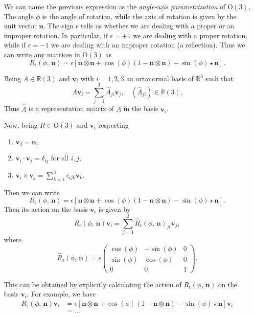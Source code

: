 We can name the previous expression as the \textit{angle-axis parametrization} of \(\mathrm{O}(3)\). The angle \(\phi\) is the angle of rotation, while the axis of rotation is given by the unit vector \(\mathbf{n}\). The sign \(\epsilon\) tells us whether we are dealing with a proper or an improper rotation. In particular, if \(\epsilon = +1\) we are dealing with a proper rotation, while if \(\epsilon = -1\) we are dealing with an improper rotation (a reflection). Thus we can write any matrices in \(\mathrm{O}(3)\) as
\[
    R_{\epsilon}(\phi,\,\mathbf{n}) = \epsilon \left[ \mathbf{n} \otimes \mathbf{n} + \cos(\phi) (1 - \mathbf{n} \otimes \mathbf{n}) - \sin(\phi) \star \mathbf{n} \right].
\]

\begin{example}[Exercise]
    Being \(A \in \mathbb{R}(3)\) and \(\mathbf{v}_i\) with \(i=1,2,3\) an ortonormal basis of \(\mathbb{R}^3\) such that
    \[
        A \mathbf{v}_i = \sum_{j=1}^3 \hat{A}_{ji} \mathbf{v}_j, \quad (\hat{A}_{ji}) \in \mathbb{R}(3).
    \]
    Thus \(\hat{A}\) is a representation matrix of \(A\) in the basis \(\mathbf{v}_i\).

    Now, being \(R \in \mathrm{O}(3)\) and \(\mathbf{v}_i\)  respecting
    \begin{enumerate}
        \item \(\mathbf{v}_3 = \mathbf{n}\),
        \item \(\mathbf{v}_i \cdot \mathbf{v}_j = \delta_{ij}\) for all \(i,j\),
        \item \(\mathbf{v}_i \times \mathbf{v}_j = \sum_{k=1}^3 \epsilon_{ijk} \mathbf{v}_k\).
    \end{enumerate}
    Then we can write
    \[
        R_{\epsilon}(\phi,\,\mathbf{n}) = \epsilon \left[ \mathbf{n} \otimes \mathbf{n} + \cos(\phi) (1 - \mathbf{n} \otimes \mathbf{n}) - \sin(\phi) \star \mathbf{n} \right].
    \]
    Then its action on the basis \(\mathbf{v}_i\) is given by
    \[
        R_{\epsilon}(\phi,\,\mathbf{n}) \mathbf{v}_i = \sum_{j=1}^3 \hat{R}_{\epsilon}(\phi,\,\mathbf{n})_{ji} \mathbf{v}_j,
    \]
    where
    \[
        \hat{R}_{\epsilon}(\phi,\,\mathbf{n}) = \epsilon \begin{pmatrix}
            \cos(\phi) & -\sin(\phi) & 0 \\
            \sin(\phi) & \cos(\phi)  & 0 \\
            0          & 0           & 1
        \end{pmatrix}.
    \]

    This can be obtained by explicitly calculating the action of \(R_{\epsilon}(\phi,\,\mathbf{n})\) on the basis \(\mathbf{v}_i\). For example, we have
    \[
        \begin{aligned}
            R_{\epsilon}(\phi,\,\mathbf{n}) \mathbf{v}_i & = \epsilon \left[ \mathbf{n} \otimes \mathbf{n} + \cos(\phi) (1 - \mathbf{n} \otimes \mathbf{n}) - \sin(\phi) \star \mathbf{n} \right] \mathbf{v}_i \\
                                                         & = \dots
        \end{aligned}
    \]


\end{example}

